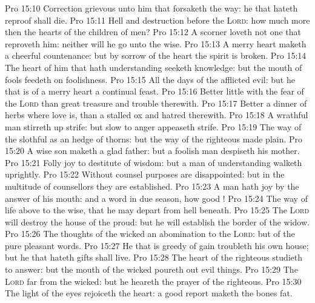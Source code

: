 \vs Pro 15:10 Correction  grievous unto him that forsaketh the way:  he that hateth reproof shall die.
\vs Pro 15:11 Hell and destruction  before the \textsc{Lord}: how much more then the hearts of the children of men?
\vs Pro 15:12 A scorner loveth not one that reproveth him: neither will he go unto the wise.
\vs Pro 15:13 A merry heart maketh a cheerful countenance: but by sorrow of the heart the spirit is broken.
\vs Pro 15:14 The heart of him that hath understanding seeketh knowledge: but the mouth of fools feedeth on foolishness.
\vs Pro 15:15 All the days of the afflicted  evil: but he that is of a merry heart  a continual feast.
\vs Pro 15:16 Better  little with the fear of the \textsc{Lord} than great treasure and trouble therewith.
\vs Pro 15:17 Better  a dinner of herbs where love is, than a stalled ox and hatred therewith.
\vs Pro 15:18 A wrathful man stirreth up strife: but  slow to anger appeaseth strife.
\vs Pro 15:19 The way of the slothful  as an hedge of thorns: but the way of the righteous  made plain.
\vs Pro 15:20 A wise son maketh a glad father: but a foolish man despiseth his mother.
\vs Pro 15:21 Folly  joy to  destitute of wisdom: but a man of understanding walketh uprightly.
\vs Pro 15:22 Without counsel purposes are disappointed: but in the multitude of counsellors they are established.
\vs Pro 15:23 A man hath joy by the answer of his mouth: and a word  in due season, how good !
\vs Pro 15:24 The way of life  above to the wise, that he may depart from hell beneath.
\vs Pro 15:25 The \textsc{Lord} will destroy the house of the proud: but he will establish the border of the widow.
\vs Pro 15:26 The thoughts of the wicked  an abomination to the \textsc{Lord}: but  of the pure  pleasant words.
\vs Pro 15:27 He that is greedy of gain troubleth his own house; but he that hateth gifts shall live.
\vs Pro 15:28 The heart of the righteous studieth to answer: but the mouth of the wicked poureth out evil things.
\vs Pro 15:29 The \textsc{Lord}  far from the wicked: but he heareth the prayer of the righteous.
\vs Pro 15:30 The light of the eyes rejoiceth the heart:  a good report maketh the bones fat.
